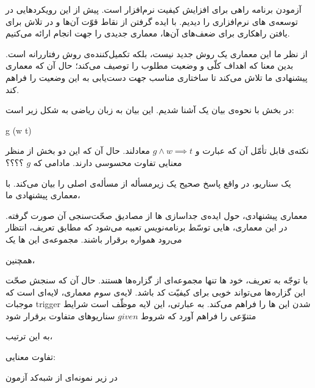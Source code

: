 آزمودن برنامه راهی برای افزایش کیفیت نرم‌افزار است. پیش از این رویکردهایی در توسعه‌ی های نرم‌افزاری را دیدیم. با ایده گرفتن از نقاط قوّت آن‌ها و در تلاش برای یافتن راهکاری برای ضعف‌های آن‌ها، معماری جدیدی را جهت انجام  ارائه می‌کنیم.

از نظر ما این معماری یک روش جدید نیست، بلکه تکمیل‌کننده‌ی روش رفتاررانه است. بدین معنا که  اهداف کلّی و وضعیت مطلوب را توصیف می‌کند؛ حال آن که معماری پیشنهادی ما تلاش می‌کند تا ساختاری مناسب جهت دست‌یابی به این وضعیت را فراهم کند.

در بخش  با نحوه‌ی بیان یک  آشنا شدیم. این بیان به زبان ریاضی به شکل زیر است:

g \implies (w \implies t)


نکته‌ی قابل تأمّل آن که عبارت  و $g \land w \implies t$ معادلند. حال آن که این دو بخش از منظر معنایی تفاوت محسوسی دارند. مادامی که $g$ ؟؟؟؟


یک سناریو، در واقع پاسخ صحیح یک زیرمسأله از مسأله‌ی اصلی را بیان می‌کند. با معماری پیشنهادی ما، 

معماری پیشنهادی، حول ایده‌ی جداسازی ها از مصادیق صحّت‌سنجی آن صورت گرفته. در این معماری، هایی توسّط برنامه‌نویس تعبیه می‌شود که مطابق تعریف، انتظار می‌رود همواره برقرار باشند. مجموعه‌ی این ها یک 

همچنین، 

با توجّه به تعریف، خود ها تنها مجموعه‌ای از گزاره‌ها هستند. حال آن که سنجش صحّت این گزاره‌ها می‌تواند  خوبی برای کیفیّت کد باشد. لایه‌ی سوم معماری، لایه‌ای است که موجبات trigger شدن این ها را فراهم می‌کند. به عبارتی، این لایه موظّف است شرایط متنوّعی را فراهم آورد که شروط $given$ سناریوهای متفاوت برقرار شود

به این ترتیب، 

تفاوت معنایی: 


در زیر نمونه‌ای از شبه‌کد آزمون 

